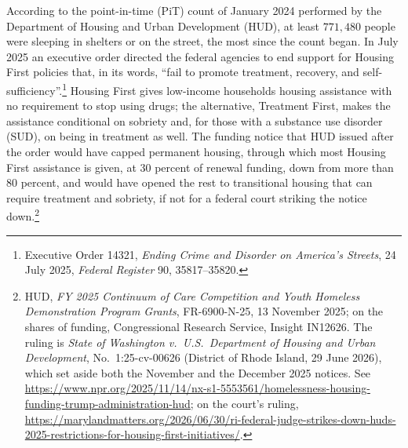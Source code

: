 \documentclass[10pt]{article}
\begin{document}
According to the point-in-time (PiT) count of January 2024 performed by the Department of Housing and Urban Development (HUD), at least $771{,}480$ people were sleeping in shelters or on the street, the most since the count began. In July 2025 an executive order directed the federal agencies to end support for Housing First policies that, in its words, ``fail to promote treatment, recovery, and self-sufficiency''.\footnote{Executive Order 14321, \emph{Ending Crime and Disorder on America's
Streets}, 24 July 2025, \emph{Federal Register} 90, 35817--35820.} Housing First gives low-income households housing assistance with no requirement to stop using drugs; the alternative, Treatment First, makes the assistance conditional on sobriety and, for those with a substance use disorder (SUD), on being in treatment as well. The funding notice that HUD issued after the order would have capped permanent housing, through which most Housing First assistance is given, at 30 percent of renewal funding, down from more than 80 percent, and would have opened the rest to transitional housing that can require treatment and sobriety, if not for a federal court striking the notice down.\footnote{HUD, \emph{FY 2025 Continuum of Care Competition and Youth Homeless Demonstration Program Grants}, FR-6900-N-25, 13 November 2025; on the shares of funding, Congressional Research Service, Insight IN12626. The ruling is \emph{State of Washington v.\ U.S.\ Department of Housing and Urban Development}, No.\ 1:25-cv-00626 (District of Rhode Island, 29 June 2026), which set aside both the November and the December 2025 notices. See
\url{https://www.npr.org/2025/11/14/nx-s1-5553561/homelessness-housing-funding-trump-administration-hud}; on the court's ruling, \url{https://marylandmatters.org/2026/06/30/ri-federal-judge-strikes-down-huds-2025-restrictions-for-housing-first-initiatives/}.}
\end{document}
